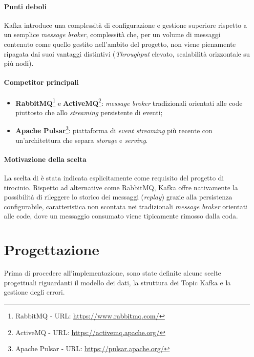 \paragraph{Punti deboli}
Kafka introduce una complessità di configurazione e gestione superiore rispetto a un semplice \textit{message broker}, complessità che, per un volume di messaggi contenuto come quello gestito nell'ambito del progetto, non viene pienamente ripagata dai suoi vantaggi distintivi (\textit{\gls{Throughput}} elevato, scalabilità orizzontale su più nodi).

\paragraph{Competitor principali}
\begin{itemize}
    \item \textbf{RabbitMQ}\footnote{RabbitMQ - URL: \url{https://www.rabbitmq.com/}} e \textbf{ActiveMQ}\footnote{ActiveMQ - URL: \url{https://activemq.apache.org/}}: \textit{message broker} tradizionali orientati alle code piuttosto che allo \textit{streaming} persistente di eventi;
    \item \textbf{Apache Pulsar}\footnote{Apache Pulsar - URL: \url{https://pulsar.apache.org/}}: piattaforma di \textit{event streaming} più recente con un'architettura che separa \textit{storage} e \textit{serving}.
\end{itemize}

\paragraph{Motivazione della scelta}
La scelta di  è stata indicata esplicitamente come requisito del progetto di tirocinio. Rispetto ad alternative come RabbitMQ, Kafka offre nativamente la possibilità di rileggere lo storico dei messaggi (\textit{replay}) grazie alla persistenza configurabile, caratteristica non scontata nei tradizionali \textit{message broker} orientati alle code, dove un messaggio consumato viene tipicamente rimosso dalla coda.

\newpage
\section{Progettazione}
\label{Progettazione}
Prima di procedere all'implementazione, sono state definite alcune scelte progettuali riguardanti il modello dei dati, la struttura dei \gls{Topic Kafka} e la gestione degli errori.

